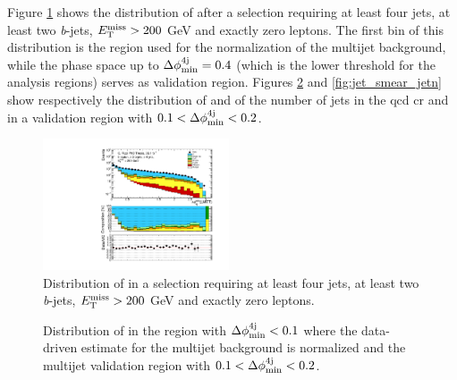 Figure \ref{fig:jet_smear_dphi} shows the distribution of \dphimin after a selection requiring at least four jets, at least two \textit{b}-jets, $E_{\rm T}^{\mathrm{miss}}>200$ GeV and exactly zero leptons. The first bin of this distribution is the region used for the normalization of the multijet background, 
while the phase space up to $\Delta\phi_{\rm{min}}^{4{\rm{j}}}=0.4$ (which is the lower threshold for the analysis regions) serves as validation region. 
Figures \ref{fig:jet_smear_met} and \ref{fig:jet_smear_jetn} show respectively the distribution of \met and of the number of jets in the \gls{qcd} \gls{cr} and in a validation region with $0.1 < \Delta\phi_{\rm{min}}^{4{\rm{j}}} < 0.2$.

\begin{figure}[h!]
\centering 
\includegraphics[width=0.49\textwidth]{figures/susy_common/jet_smearing/data_mc_dphi_min_QCD_noDphi.pdf}
\caption{Distribution of \dphimin in a selection requiring at least four jets, at least two \textit{b}-jets, $E_{\rm T}^{\mathrm{miss}}>200$ GeV and exactly zero leptons.}\label{fig:jet_smear_dphi}
\end{figure}


\begin{figure}[h!]
\centering 
{}
\caption{Distribution of \met in  the region with $\Delta\phi_{\rm{min}}^{4{\rm{j}}} < 0.1$ where the data-driven estimate for the multijet background is normalized and  the multijet validation region with $0.1 < \Delta\phi_{\rm{min}}^{4{\rm{j}}} < 0.2$.}\label{fig:jet_smear_met}
\end{figure}

